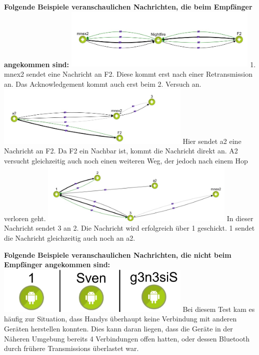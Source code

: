 \textbf{Folgende Beispiele veranschaulichen Nachrichten, die beim
Empfänger angekommen sind:}
\includegraphics[width=0.7\textwidth]{belege/grosstests/Bilder/Grosstest2/Test1Erfolg2.jpg}
1. mnex2 sendet eine Nachricht an F2. Diese kommt erst nach einer
Retransmission an. Das Acknowledgement kommt auch erst beim 2. Versuch
an.
\includegraphics[width=0.7\textwidth]{belege/grosstests/Bilder/Grosstest2/Test1Erfolg1.jpg}
Hier sendet a2 eine Nachricht an F2. Da F2 ein Nachbar ist, kommt die
Nachricht direkt an. A2 versucht gleichzeitig auch noch einen weiteren
Weg, der jedoch nach einem Hop verloren geht.
\includegraphics[width=0.7\textwidth]{belege/grosstests/Bilder/Grosstest2/Test1Erfolg3.jpg}
In dieser Nachricht sendet 3 an 2. Die Nachricht wird erfolgreich über 1
geschickt. 1 sendet die Nachricht gleichzeitig auch noch an a2.

\textbf{Folgende Beispiele veranschaulichen Nachrichten, die nicht beim
Empfänger angekommen sind:}
\includegraphics[width=0.7\textwidth]{belege/grosstests/Bilder/Grosstest2/Test1Misserfolg2.jpg}
Bei diesem Test kam es häufig zur Situation, dass Handys überhaupt keine
Verbindung mit anderen Geräten herstellen konnten. Dies kann daran
liegen, dass die Geräte in der Näheren Umgebung bereits 4 Verbindungen
offen hatten, oder dessen Bluetooth durch frühere Transmissions
überlastet war.

